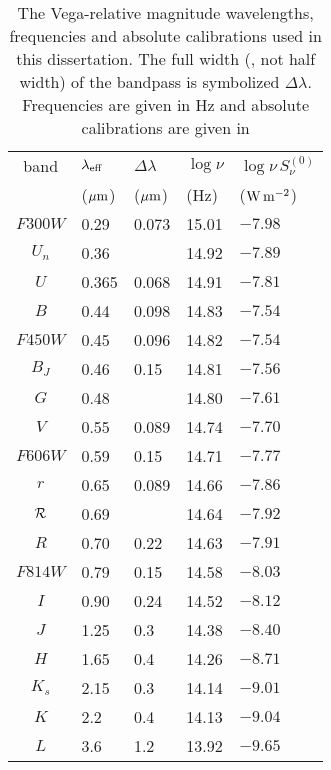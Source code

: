 \clearpage
\begin{table}[p]
\begin{center}
\begin{tabular}{cllll}
band & $\lambda_{\rm eff}$ & $\Delta\lambda$ & $\log\nu$ & $\log\nu\,S_{\nu}^{(0)}$ \\
     & ($\mu{\rm m}$) & ($\mu{\rm m}$) & (Hz)  & (${\rm W\,m^{-2}}$) \\[0.5ex]
\hline
$F300W$  & 0.29  & 0.073 & 15.01 & $-7.98$ \\
$U_n$    & 0.36  &       & 14.92 & $-7.89$ \\
$U$      & 0.365 & 0.068 & 14.91 & $-7.81$ \\
$B$      & 0.44  & 0.098 & 14.83 & $-7.54$ \\
$F450W$  & 0.45  & 0.096 & 14.82 & $-7.54$ \\
$B_J$    & 0.46  & 0.15  & 14.81 & $-7.56$ \\
$G$      & 0.48  &       & 14.80 & $-7.61$ \\
$V$      & 0.55  & 0.089 & 14.74 & $-7.70$ \\
$F606W$  & 0.59  & 0.15  & 14.71 & $-7.77$ \\
$r$      & 0.65  & 0.089 & 14.66 & $-7.86$ \\
$\cal R$ & 0.69  &       & 14.64 & $-7.92$ \\
$R$      & 0.70  & 0.22  & 14.63 & $-7.91$ \\
$F814W$  & 0.79  & 0.15  & 14.58 & $-8.03$ \\
$I$      & 0.90  & 0.24  & 14.52 & $-8.12$ \\
$J$      & 1.25  & 0.3   & 14.38 & $-8.40$ \\
$H$      & 1.65  & 0.4   & 14.26 & $-8.71$ \\
$K_s$    & 2.15  & 0.3   & 14.14 & $-9.01$ \\
$K$      & 2.2   & 0.4   & 14.13 & $-9.04$ \\
$L$      & 3.6   & 1.2   & 13.92 & $-9.65$ \\
\end{tabular}
\end{center}
\caption[Vega-relative magnitude wavelengths, frequencies and absolute calibrations.]{
The Vega-relative magnitude wavelengths, frequencies and absolute
calibrations used in this dissertation.  The full width (\ie, not
half width) of the bandpass is symbolized $\Delta\lambda$.
Frequencies are given in Hz and absolute calibrations are given in
}
\end{table}
